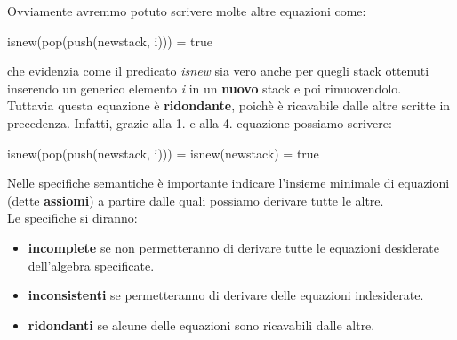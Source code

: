 \documentclass{article}
\begin{document}
	Ovviamente avremmo potuto scrivere molte altre equazioni come:
	\begin{center}
		isnew(pop(push(newstack, i))) = true
	\end{center}
	che evidenzia come il predicato \textit{isnew} sia vero anche per quegli stack ottenuti inserendo un generico elemento \textit{i} in un \textbf{nuovo} stack e poi rimuovendolo. \\
	Tuttavia questa equazione è \textbf{ridondante}, poichè è ricavabile dalle altre scritte in precedenza. Infatti, grazie alla 1. e alla 4. equazione possiamo scrivere:
	\begin{center}
		isnew(pop(push(newstack, i))) = isnew(newstack) = true
	\end{center} 
	Nelle specifiche semantiche è importante indicare l'insieme minimale di equazioni (dette \textbf{assiomi}) a partire dalle quali possiamo derivare tutte le altre. \\
	Le specifiche si diranno:
	\begin{itemize}
		\item \textbf{incomplete} se non permetteranno di derivare tutte le equazioni desiderate dell'algebra specificate. 
		\item \textbf{inconsistenti} se permetteranno di derivare delle equazioni indesiderate. 
		\item \textbf{ridondanti} se alcune delle equazioni sono ricavabili dalle altre.
	\end{itemize}
\end{document}
